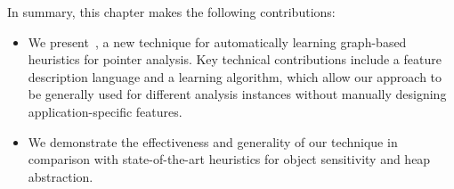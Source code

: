 In summary, this chapter makes the following contributions:
\begin{itemize}
\item We present~\ourtool, a new technique for automatically learning graph-based heuristics for pointer analysis.
Key technical contributions include a feature description language and a learning algorithm, which allow our approach to be generally used for different analysis instances without manually designing application-specific features.
\item We demonstrate the effectiveness and generality of our technique in comparison with state-of-the-art heuristics for object sensitivity and heap abstraction.

%
\end{itemize}

































